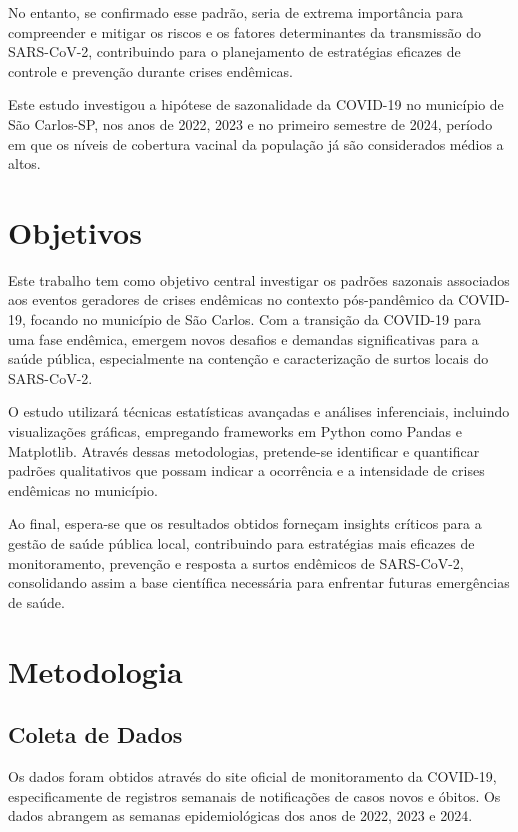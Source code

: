 \documentclass[a4paper,12pt]{report}
\begin{document}
No entanto, se confirmado esse padrão, seria de extrema importância para compreender e mitigar os riscos e os fatores determinantes da transmissão do SARS-CoV-2, contribuindo para o planejamento de estratégias eficazes de controle e prevenção durante crises endêmicas.

Este estudo investigou a hipótese de sazonalidade da COVID-19 no município de São Carlos-SP, nos anos de 2022, 2023 e no primeiro semestre de 2024, período em que os níveis de cobertura vacinal da população já são considerados médios a altos.

\chapter*{Objetivos}
\label{chap:objetivos}
Este trabalho tem como objetivo central investigar os padrões sazonais associados aos eventos geradores de crises endêmicas no contexto pós-pandêmico da COVID-19, focando no município de São Carlos. Com a transição da COVID-19 para uma fase endêmica, emergem novos desafios e demandas significativas para a saúde pública, especialmente na contenção e caracterização de surtos locais do SARS-CoV-2.

O estudo utilizará técnicas estatísticas avançadas e análises inferenciais, incluindo visualizações gráficas, empregando frameworks em Python como Pandas e Matplotlib. Através dessas metodologias, pretende-se identificar e quantificar padrões qualitativos que possam indicar a ocorrência e a intensidade de crises endêmicas no município.

Ao final, espera-se que os resultados obtidos forneçam insights críticos para a gestão de saúde pública local, contribuindo para estratégias mais eficazes de monitoramento, prevenção e resposta a surtos endêmicos de SARS-CoV-2, consolidando assim a base científica necessária para enfrentar futuras emergências de saúde.

\chapter*{Metodologia}
\label{chap:metodologia}

\section*{Coleta de Dados}
Os dados foram obtidos através do site oficial de monitoramento da COVID-19\cite{brasilcovid}, especificamente de registros semanais de notificações de casos novos e óbitos. Os dados abrangem as semanas epidemiológicas dos anos de 2022, 2023 e 2024.
\end{document}
